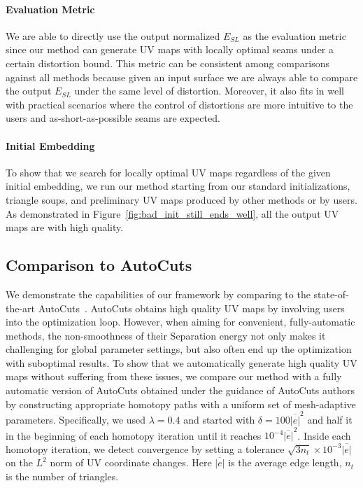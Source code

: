 \paragraph{Evaluation Metric}
We are able to directly use the output normalized $E_{SL}$ as the evaluation metric since our method can generate UV maps with locally optimal seams under a certain distortion bound. This metric can be consistent among comparisons against all methods because given an input surface we are always able to compare the output $E_{SL}$ under the same level of distortion. Moreover, it also fits in well with practical scenarios where the control of distortions are more intuitive to the users and as-short-as-possible seams are expected.

\paragraph{Initial Embedding}
 To show that we search for locally optimal UV maps regardless of the given initial embedding, we run our method starting from our standard initializations, triangle soups, and preliminary UV maps produced by other methods or by users. As demonstrated in Figure~\ref{fig:bad_init_still_ends_well}, all the output UV maps are with high quality.


\subsection{Comparison to AutoCuts}

We demonstrate the capabilities of our framework by comparing to the state-of-the-art AutoCuts~\cite{Poranne2017Autocuts}.
AutoCuts obtains high quality UV maps by involving users into the optimization loop. However, when aiming for convenient, fully-automatic methods, the non-smoothness of their Separation energy not only makes it challenging for global parameter settings, but also often end up the optimization with suboptimal results. To show that we automatically generate high quality UV maps without suffering from these issues, we compare our method with a fully automatic version of AutoCuts obtained under the guidance of AutoCuts authors by constructing appropriate homotopy paths with a uniform set of mesh-adaptive parameters. 
Specifically, we used $\lambda = 0.4$ and started with $\delta=100\overline{|e|}^2$ and half it in the beginning of each homotopy iteration until it reaches $10^{-4}\overline{|e|}^2$. Inside each homotopy iteration, we detect convergence by setting a tolerance $\sqrt{3n_t}\times10^{-3}\overline{|e|}$ on the $L^2$ norm of UV coordinate changes. Here $\overline{|e|}$ is the average edge length, $n_t$ is the number of triangles.

